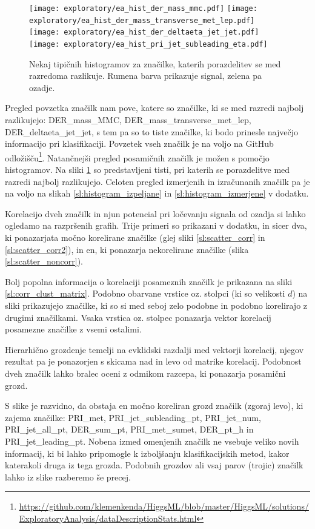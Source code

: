 \documentclass[11pt,a4paper,openany]{book}
\begin{document}
\begin{figure}[ht!]
	\texttt{[image: exploratory/ea\_hist\_der\_mass\_mmc.pdf]}
	\texttt{[image: exploratory/ea\_hist\_der\_mass\_transverse\_met\_lep.pdf]}	
	\texttt{[image: exploratory/ea\_hist\_der\_deltaeta\_jet\_jet.pdf]}		
	\texttt{[image: exploratory/ea\_hist\_pri\_jet\_subleading\_eta.pdf]}	
	\caption{Nekaj tipičnih histogramov za značilke, katerih porazdelitev se med razredoma razlikuje. Rumena barva prikazuje signal, zelena pa ozadje.}
	\label{sl:histogrami}			
\end{figure}

Pregled povzetka značilk nam pove, katere so značilke, ki se med razredi najbolj razlikujejo: DER\_mass\_MMC, DER\_mass\_transverse\_met\_lep, DER\_deltaeta\_jet\_jet, s tem pa so to tiste značilke, ki bodo prinesle največjo informacijo pri klasifikaciji. Povzetek vseh značilk je na voljo na GitHub odložišču\footnote{\url{https://github.com/klemenkenda/HiggsML/blob/master/HiggsML/solutions/ExploratoryAnalysis/dataDescriptionStats.html}}. Natančnejši pregled posamičnih značilk je možen s pomočjo histogramov. Na sliki \ref{sl:histogrami} so predstavljeni tisti, pri katerih se porazdelitve med razredi najbolj razlikujejo. Celoten pregled izmerjenih in izračunanih značilk pa je na voljo na slikah \ref{sl:histogram_izpeljane} in \ref{sl:histogram_izmerjene} v dodatku.

Korelacijo dveh značilk in njun potencial pri ločevanju signala od ozadja si lahko ogledamo na razpršenih grafih. Trije primeri so prikazani v dodatku, in sicer dva, ki ponazarjata močno korelirane značilke (glej sliki \ref{sl:scatter_corr} in \ref{sl:scatter_corr2}), in en, ki ponazarja nekorelirane značilke (slika \ref{sl:scatter_noncorr}).

Bolj popolna informacija o korelaciji posameznih značilk je prikazana na sliki \ref{sl:corr_clust_matrix}. Podobno obarvane vrstice oz. stolpci (ki so velikosti $d$) na sliki prikazujejo značilke, ki so si med seboj zelo podobne in podobno korelirajo z drugimi značilkami. Vsaka vrstica oz. stolpec ponazarja vektor korelacij posamezne značilke z vsemi ostalimi.

Hierarhično grozdenje temelji na evklidski razdalji med vektorji korelacij, njegov rezultat pa je ponazorjen s skicama nad in levo od matrike korelacij. Podobnost dveh značilk lahko bralec oceni z odmikom razcepa, ki ponazarja posamični grozd.

S slike je razvidno, da obstaja en močno koreliran grozd značilk (zgoraj levo), ki zajema značilke: PRI\_met, PRI\_jet\_subleading\_pt, PRI\_jet\_num, PRI\_jet\_all\_pt, DER\_sum\_pt, PRI\_met\_sumet, DER\_pt\_h in PRI\_jet\_leading\_pt. Nobena izmed omenjenih značilk ne vsebuje veliko novih informacij, ki bi lahko pripomogle k izboljšanju klasifikacijskih metod, kakor katerakoli druga iz tega grozda. Podobnih grozdov ali vsaj parov (trojic) značilk lahko iz slike razberemo še precej.
\end{document}
